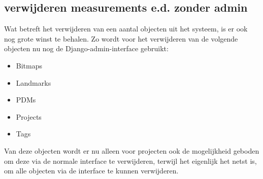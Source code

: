 \subsection{verwijderen measurements e.d. zonder admin}
Wat betreft het verwijderen van een aantal objecten uit het systeem, is er ook nog grote winst te behalen.
Zo wordt voor het verwijderen van de volgende objecten nu nog de Django-admin-interface gebruikt:
\begin{itemize}
  \item Bitmaps
  \item Landmarks
  \item PDMs
  \item Projects
  \item Tags
\end{itemize}
Van deze objecten wordt er nu alleen voor projecten ook de mogelijkheid geboden om deze via de normale interface te verwijderen, terwijl het eigenlijk het netst is, om alle objecten via de interface te kunnen verwijderen.

